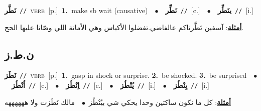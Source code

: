 \documentclass[10pt,a4paper,twoside]{article} %
\begin{document}
\begin{multicols}{2}
{\setlength\topsep{0pt}\textbf{\foreignlanguage{arabic}{نَطَّر}}\ {\color{gray}\texttt{//}\color{black}}\ \textsc{verb}\ [p.]\ \textbf{1.}~make sb wait (causative)\ \ $\bullet$\ \ \setlength\topsep{0pt}\textbf{\foreignlanguage{arabic}{نَطِّر}}\ {\color{gray}\texttt{//}\color{black}}\ [c.]\ \ $\bullet$\ \ \setlength\topsep{0pt}\textbf{\foreignlanguage{arabic}{ينَطِّر}}\ {\color{gray}\texttt{//}\color{black}}\ [i.]\  \begin{flushright}\color{gray}\foreignlanguage{arabic}{\textbf{\underline{\foreignlanguage{arabic}{أمثلة}}}: آسفين نَطَّرناكم عالفاضي.تفضلوا الأكياس وهي الأمانة اللي وصّانا عليها الحج.}\end{flushright}\color{black}} \vspace{2mm}

\vspace{-3mm}
\subsection*{\color{blue}\foreignlanguage{arabic}{ن.ط.ز}\color{blue}{}} 

{\setlength\topsep{0pt}\textbf{\foreignlanguage{arabic}{نَطَز}}\ {\color{gray}\texttt{//}\color{black}}\ \textsc{verb}\ [p.]\ \textbf{1.}~gasp in shock or surprise.  \textbf{2.}~be shocked.  \textbf{3.}~be surprised\ \ $\bullet$\ \ \setlength\topsep{0pt}\textbf{\foreignlanguage{arabic}{اُنْطُز}}\ {\color{gray}\texttt{//}\color{black}}\ [c.]\ \ $\bullet$\ \ \setlength\topsep{0pt}\textbf{\foreignlanguage{arabic}{اِنْطُز}}\ {\color{gray}\texttt{//}\color{black}}\ [c.]\ \ $\bullet$\ \ \setlength\topsep{0pt}\textbf{\foreignlanguage{arabic}{يُنْطُز}}\ {\color{gray}\texttt{//}\color{black}}\ [i.]\ \ $\bullet$\ \ \setlength\topsep{0pt}\textbf{\foreignlanguage{arabic}{يِنْطُز}}\ {\color{gray}\texttt{//}\color{black}}\ [i.]\  \begin{flushright}\color{gray}\foreignlanguage{arabic}{\textbf{\underline{\foreignlanguage{arabic}{أمثلة}}}: كل ما نكون ساكتين وحدا يحكي شي بيُنْطُز\ $\bullet$\ \  مالك نَطَزت ولا ههههههه}\end{flushright}\color{black}} \vspace{2mm}


\end{multicols}
\end{document}
